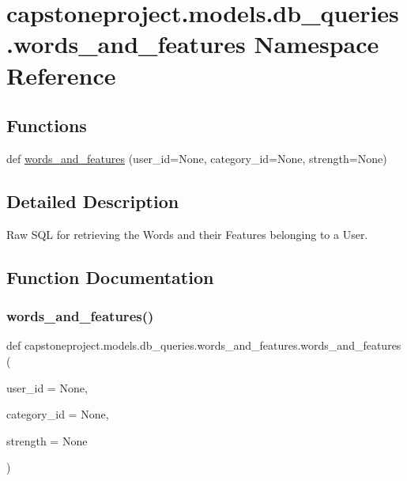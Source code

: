 \hypertarget{namespacecapstoneproject_1_1models_1_1db__queries_1_1words__and__features}{}\section{capstoneproject.\+models.\+db\+\_\+queries.\+words\+\_\+and\+\_\+features Namespace Reference}
\label{namespacecapstoneproject_1_1models_1_1db__queries_1_1words__and__features}
\subsection*{Functions}
\begin{DoxyCompactItemize}
\item 
def \mbox{\hyperlink{namespacecapstoneproject_1_1models_1_1db__queries_1_1words__and__features_a4bc7f4ad6302131e84ccdf01081aad5b}{words\+\_\+and\+\_\+features}} (user\+\_\+id=None, category\+\_\+id=None, strength=None)
\end{DoxyCompactItemize}


\subsection{Detailed Description}
\begin{DoxyVerb}Raw SQL for retrieving the Words and their Features belonging to a User.\end{DoxyVerb}
 

\subsection{Function Documentation}
\mbox{\label{namespacecapstoneproject_1_1models_1_1db__queries_1_1words__and__features_a4bc7f4ad6302131e84ccdf01081aad5b}} 
\subsubsection{\texorpdfstring{words\+\_\+and\+\_\+features()}{words\_and\_features()}}
{\footnotesize\ttfamily def capstoneproject.\+models.\+db\+\_\+queries.\+words\+\_\+and\+\_\+features.\+words\+\_\+and\+\_\+features (\begin{DoxyParamCaption}\item[{}]{user\+\_\+id = {\ttfamily None},  }\item[{}]{category\+\_\+id = {\ttfamily None},  }\item[{}]{strength = {\ttfamily None} }\end{DoxyParamCaption})}

